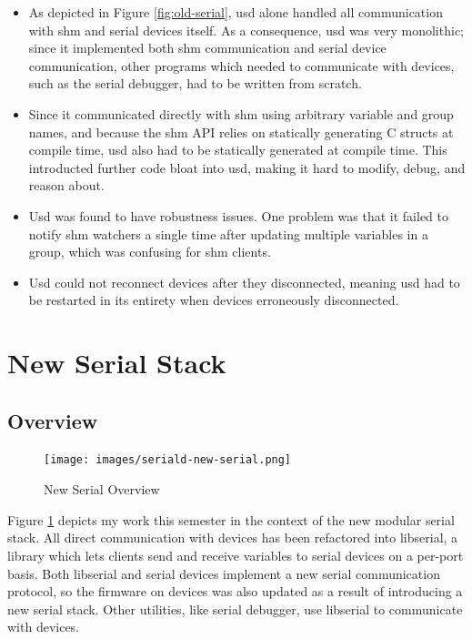 \documentclass[11pt]{article}
\let\oldsection\section
\renewcommand\section{\clearpage\oldsection}
\begin{document}
\begin{itemize}

\item As depicted in Figure \ref{fig:old-serial}, usd alone handled all communication with shm and serial devices itself. As a consequence, usd was very monolithic; since it implemented both shm communication and serial device communication, other programs which needed to communicate with devices, such as the serial debugger, had to be written from scratch.

\item Since it communicated directly with shm using arbitrary variable and group names, and because the shm API relies on statically generating C structs at compile time, usd also had to be statically generated at compile time. This introducted further code bloat into usd, making it hard to modify, debug, and reason about.

\item Usd was found to have robustness issues. One problem was that it failed to notify shm watchers a single time after updating multiple variables in a group, which was confusing for shm clients.

\item Usd could not reconnect devices after they disconnected, meaning usd had to be restarted in its entirety when devices erroneously disconnected.

\end{itemize}

\section{New Serial Stack}

\subsection{Overview}

\begin{figure}
    \centering
    \texttt{[image: images/seriald-new-serial.png]}
    \caption{New Serial Overview}
    \label{fig:new-serial}
\end{figure}

Figure \ref{fig:new-serial} depicts my work this semester in the context of the new modular serial stack. All direct communication with devices has been refactored into libserial, a library which lets clients send and receive variables to serial devices on a per-port basis. Both libserial and serial devices implement a new serial communication protocol, so the firmware on devices was also updated as a result of introducing a new serial stack. Other utilities, like serial debugger, use libserial to communicate with devices.
\end{document}
